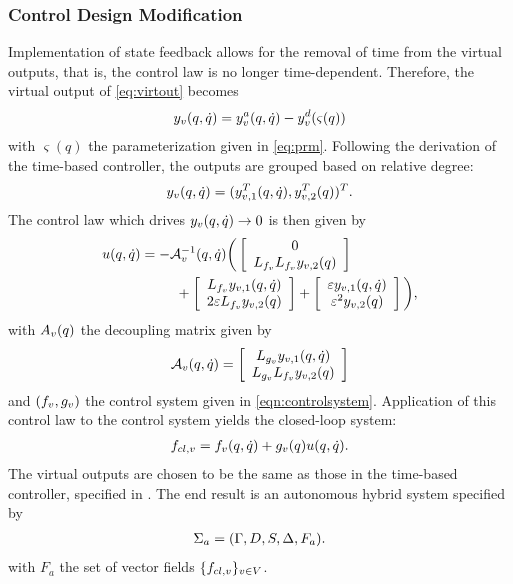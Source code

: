 \subsubsection{Control Design Modification} Implementation of state feedback allows for the removal of time from the virtual outputs, that is, the control law is no longer time-dependent. Therefore, the virtual output of \eqref{eq:virtout} becomes
\begin{align}
  y_{v}(q, {\dot q}) = y_{v}^a(q, {\dot q}) - y_{v}^{d}(\varsigma(q))
\end{align}
with $\varsigma(q)$ the parameterization given in \eqref{eq:prm}. Following the derivation of the time-based controller, the outputs are grouped based on relative degree:
\begin{align}
  y_{v}(q, {\dot q}) = (y_{v,1}^{T}(q, {\dot q}), y_{v,2}^{T}(q))^{T}.
\end{align}
The control law which drives $y_{v}(q, {\dot q}) \to 0$ is then given by
\begin{align}
  \lefteqn{u(q, {\dot q}) = -\mathcal{A}_{\vo}^{-1}(q, {\dot q}) \bigg(
  \left[ \begin{array}{c}
      0\\
      L_{f_{\vo}} L_{f_{\vo}} y_{\vo,2}(q)
    \end{array} \right]}\\
  \nonumber
  &&\hspace{15mm}\mbox{}+
  \left[ \begin{array}{c}
      L_{f_{\vo}} y_{\vo,1}(q, {\dot q})\\
      2 \varepsilon L_{f_{\vo}} y_{\vo,2}(q)
    \end{array} \right] +
  \left[ \begin{array}{c}
      \varepsilon y_{\vo,1}(q, {\dot q})\\
      \varepsilon^2 y_{\vo,2}(q)
    \end{array} \right]\bigg),
\end{align}
with $A_{v}(q)$ the decoupling matrix given by
\begin{align}
  \mathcal{A}_{v}(q, {\dot q}) =
  \left[\begin{array}{c}
      L_{g_{v}} y_{v,1} (q, {\dot q})\\
      L_{g_{v}} L_{f_{v}} y_{{v},2}(q)
    \end{array}\right]
\end{align}
and $(f_{v}, g_{v})$ the control system given in \eqref{eqn:controlsystem}. Application of this control law to the control system yields the closed-loop system:
\begin{align}
  f_{cl,v} = f_{v}(q, {\dot q}) + g_{v}(q) u(q, {\dot q}).
\end{align}
The virtual outputs are chosen to be the same as those in the time-based controller, specified in . The end result is an autonomous hybrid system specified by
\begin{align}
  \Sigma_{a} = (\Gamma, D, S, \Delta, F_a).
\end{align}
with $F_a$ the set of vector fields $\{f_{cl,v}\}_{v \in V}$.

